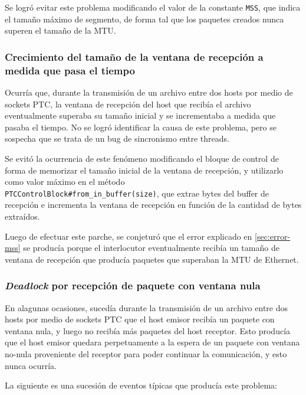 \documentclass[a4paper, 10pt, twoside]{article}
\begin{document}
Se logró evitar este problema modificando el valor de la constante \texttt{MSS}, que indica el tamaño máximo de segmento, de forma tal que los paquetes creados nunca superen el tamaño de la MTU.


\subsubsection{Crecimiento del tamaño de la ventana de recepción a medida que pasa el tiempo}

Ocurría que, durante la transmisión de un archivo entre dos hosts por medio de sockets PTC, la ventana de recepción del host que recibía el archivo eventualmente superaba su tamaño inicial y se incrementaba a medida que pasaba el tiempo. No se logró identificar la causa de este problema, pero se sospecha que se trata de un bug de sincronismo entre threads.

Se evitó la ocurrencia de este fenómeno modificando el bloque de control de forma de memorizar el tamaño inicial de la ventana de recepción, y utilizarlo como valor máximo en el método \\ \texttt{PTCControlBlock\#from\_in\_buffer(size)}, que extrae bytes del buffer de recepción e incrementa la ventana de recepción en función de la cantidad de bytes extraídos.

Luego de efectuar este parche, se conjeturó que el error explicado en \ref{sec:error-mss} se producía porque el interlocutor eventualmente recibía un tamaño de ventana de recepción que producía paquetes que superaban la MTU de Ethernet.


\subsubsection{\emph{Deadlock} por recepción de paquete con ventana nula}

En alagunas ocasiones, sucedía durante la transmisión de un archivo entre dos hosts por medio de sockets PTC que el host emisor recibía un paquete con ventana nula, y luego no recibía más paquetes del host receptor. Esto producía que el host emisor quedara perpetuamente a la espera de un paquete con ventana no-nula proveniente del receptor para poder continuar la comunicación, y esto nunca ocurría.

La siguiente es una sucesión de eventos típicas que producía este problema:
\end{document}
